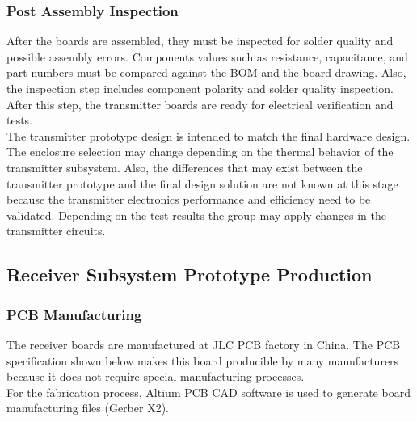 \documentclass[12pt]{article}
\begin{document}
\subsubsection{Post Assembly Inspection}
After the boards are assembled, they must be inspected for solder quality and possible assembly errors. Components values such as resistance, capacitance, and part numbers must be compared against the BOM and the board drawing. Also, the inspection step includes component polarity and solder quality inspection. After this step, the transmitter boards are ready for electrical verification and tests.\\

\indent
 The transmitter prototype design is intended to match the final hardware design. The enclosure selection may change depending on the thermal behavior of the transmitter subsystem. Also, the differences that may exist between the transmitter prototype and the final design solution are not known at this stage because the transmitter electronics performance and efficiency need to be validated. Depending on the test results the group may apply changes in the transmitter circuits.

\subsection{Receiver Subsystem Prototype Production}
\subsubsection{PCB Manufacturing} The receiver boards are manufactured at JLC PCB  factory in China. The PCB specification shown below makes this board producible by many manufacturers because it does not require special manufacturing processes.\\

\noindent
For the fabrication process, Altium PCB CAD software is used to generate board manufacturing files (Gerber X2).\\
 
\end{document}
